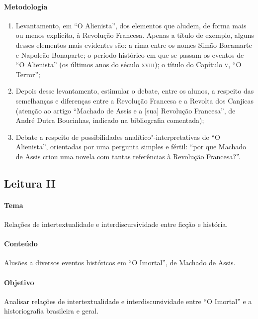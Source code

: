 \documentclass{extarticle}
\begin{document}
\paragraph{Metodologia}
\begin{enumerate}
\item Levantamento, em ``O Alienista'', dos elementos que aludem, de forma
mais ou menos explícita, à Revolução Francesa. Apenas a título de
exemplo, alguns desses elementos mais evidentes são: a rima entre os
nomes Simão Bacamarte e Napoleão Bonaparte; o período histórico em que
se passam os eventos de ``O Alienista'' (os últimos anos do século
\textsc{xviii}); o título do Capítulo \textsc{v}, ``O Terror'';

\item Depois desse levantamento, estimular o debate, entre os alunos, a
respeito das semelhanças e diferenças entre a Revolução Francesa e a
Revolta dos Canjicas (atenção ao artigo ``Machado de Assis e a [sua]
Revolução Francesa'', de André Dutra Boucinhas, indicado na bibliografia
comentada);

\item Debate a respeito de possibilidades analítico"-interpretativas de ``O
Alienista'', orientadas por uma pergunta simples e fértil: ``por que
Machado de Assis criou uma novela com tantas referências à Revolução
Francesa?''.
\end{enumerate}

\subsection{Leitura II}


\paragraph{Tema} Relações de intertextualidade e interdiscursividade entre
ficção e história.

\paragraph{Conteúdo} Alusões a diversos eventos históricos em ``O
Imortal'', de Machado de Assis.

\paragraph{Objetivo} Analisar relações de intertextualidade e
interdiscursividade entre ``O Imortal'' e a historiografia brasileira e
geral.
\end{document}
